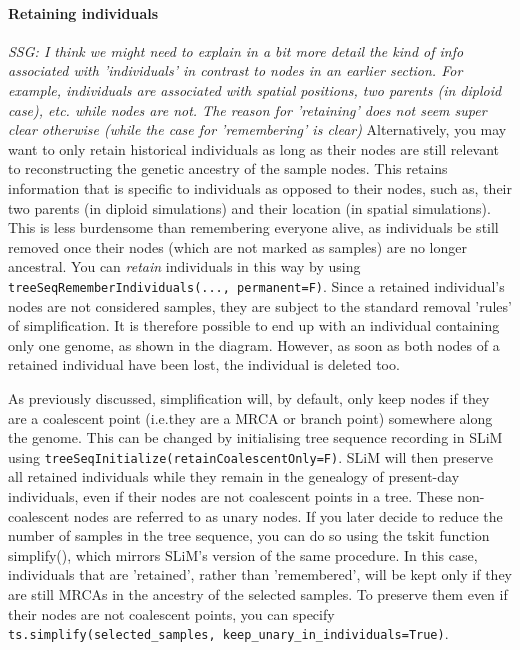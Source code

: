 \documentclass[12pt]{article}
\newcommand*{\ie}{i.e.\xcomma}
\newcommand{\comment}[1]{\textit{\color{green} #1}}
\begin{document}
\paragraph{Retaining individuals}
\comment{SSG: I think we might need to explain in a bit more detail the kind of info associated with 'individuals' in contrast to nodes in an earlier section. For example, individuals are associated with spatial positions, two parents (in diploid case), etc. while nodes are not. The reason for 'retaining' does not seem super clear otherwise (while the case for 'remembering' is clear)}
Alternatively, you may want to only retain historical individuals as long as their nodes are still
relevant to reconstructing the genetic ancestry of the sample nodes.
This retains information that is specific to individuals as opposed to their nodes,
such as, their two parents (in diploid simulations) and their location (in spatial simulations).
This is less burdensome than remembering everyone alive, as individuals be still removed once their
nodes (which are not marked as samples) are no longer ancestral.
You can \emph{retain} individuals in this way by using
\verb|treeSeqRememberIndividuals(..., permanent=F)|.
Since a retained individual’s nodes are not considered samples,
they are subject to the standard removal 'rules' of simplification.
It is therefore possible to end up with an individual containing only one genome, as shown in the diagram.
However, as soon as both nodes of a retained individual have been lost,
the individual is deleted too.

As previously discussed, simplification will, by default, only keep nodes if they are a coalescent point
(\ie they are a MRCA or branch point) somewhere along the genome.
This can be changed by initialising tree sequence recording in SLiM using
\verb|treeSeqInitialize(retainCoalescentOnly=F)|.
SLiM will then preserve all retained individuals while they remain in the genealogy of present-day individuals,
even if their nodes are not coalescent points in a tree. These non-coalescent nodes are referred to as
unary nodes.
If you later decide to reduce the number
of samples in the tree sequence, you can do so using the tskit function simplify(),
which mirrors SLiM's version of the same procedure.
In this case, individuals that are 'retained', rather than 'remembered', will be kept only
if they are still MRCAs in the ancestry of the selected samples.
To preserve them even if their nodes are not coalescent points,
you can specify
\verb|ts.simplify(selected_samples, keep_unary_in_individuals=True)|.
\end{document}
